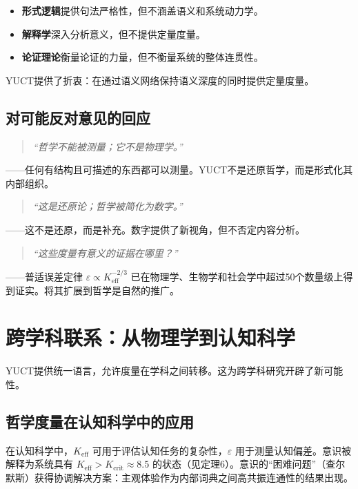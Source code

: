 \documentclass[11pt,a4paper]{article}
\newcommand{\eps}{\varepsilon}
\begin{document}
	\begin{itemize}
		\item \textbf{形式逻辑}提供句法严格性，但不涵盖语义和系统动力学。
		\item \textbf{解释学}深入分析意义，但不提供定量度量。
		\item \textbf{论证理论}衡量论证的力量，但不衡量系统的整体连贯性。
	\end{itemize}
	YUCT提供了折衷：在通过语义网络保持语义深度的同时提供定量度量。
	
	\subsection{对可能反对意见的回应}
	
	\begin{quote}
		\textit{“哲学不能被测量；它不是物理学。”}
	\end{quote}
	——任何有结构且可描述的东西都可以测量。YUCT不是还原哲学，而是形式化其内部组织。
	
	\begin{quote}
		\textit{“这是还原论；哲学被简化为数字。”}
	\end{quote}
	——这不是还原，而是补充。数字提供了新视角，但不否定内容分析。
	
	\begin{quote}
		\textit{“这些度量有意义的证据在哪里？”}
	\end{quote}
	——普适误差定律 \(\eps \propto K_{\mathrm{eff}}^{-2/3}\) 已在物理学、生物学和社会学中超过50个数量级上得到证实。将其扩展到哲学是自然的推广。
	
	\section{跨学科联系：从物理学到认知科学}
	\label{sec:interdisciplinary}
	
	YUCT提供统一语言，允许度量在学科之间转移。这为跨学科研究开辟了新可能性。
	
	\subsection{哲学度量在认知科学中的应用}
	
	在认知科学中，\(K_{\mathrm{eff}}\) 可用于评估认知任务的复杂性，\(\eps\) 用于测量认知偏差。意识被解释为系统具有 \(K_{\mathrm{eff}} > K_{\mathrm{crit}} \approx 8.5\) 的状态（见定理6）。意识的“困难问题”（查尔默斯）获得协调解决方案：主观体验作为内部词典之间高共振连通性的结果出现。
	
\end{document}
